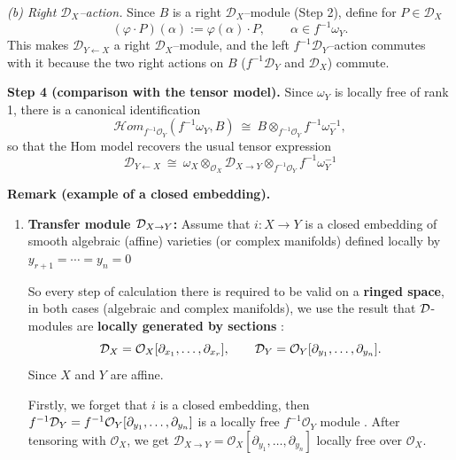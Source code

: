 \begin{example}
    \smallskip
    \emph{(b) Right $\mathcal D_X$--action.}
    Since $B$ is a right $\mathcal D_X$--module (Step 2), define for $P\in\mathcal D_X$
    \[
        (\varphi\cdot P)(\alpha) := \varphi(\alpha)\cdot P,
        \qquad \alpha\in f^{-1}\omega_Y.
    \]
    This makes $\mathcal D_{Y\leftarrow X}$ a right $\mathcal D_X$--module, and the left
    $f^{-1}\mathcal D_Y$--action commutes with it because the two right actions on $B$
    ($f^{-1}\mathcal D_Y$ and $\mathcal D_X$) commute.

    \medskip
    \noindent\textbf{Step 4 (comparison with the tensor model).}
    Since $\omega_Y$ is locally free of rank 1, there is a canonical identification
    \[
        \mathcal Hom_{f^{-1}\mathcal O_Y}(f^{-1}\omega_Y,B)
        \ \cong\ B\otimes_{f^{-1}\mathcal O_Y} f^{-1}\omega_Y^{-1},
    \]
    so that the Hom model recovers the usual tensor expression \cite[Definition~1.3.3]{hotta2008d}
    \[
        \mathcal D_{Y\leftarrow X}
        \ \cong\ \omega_X\otimes_{\mathcal O_X}\mathcal D_{X\to Y}
        \otimes_{f^{-1}\mathcal O_Y} f^{-1}\omega_Y^{-1}
    \]

    \noindent\textbf{Remark (example of a closed embedding).}
    \begin{enumerate}
        \item \textbf{Transfer module $\mathcal{D}_{X\to Y}$:}
              Assume that $i : X \to Y$ is a closed embedding of smooth algebraic (affine) varieties
              (or complex manifolds) defined locally by $y_{r+1} = \cdots = y_n = 0$

              So every step of calculation there is required to be valid on a \textbf{ringed space}, in both cases (algebraic and complex manifolds), we use the result that
              $\mathcal{D}$-modules are \textbf{locally generated by sections} \cite[\href{https://stacks.math.columbia.edu/tag/01AL}{Tag 01AL}, \href{https://stacks.math.columbia.edu/tag/01AN}{Tag 01AN}, \href{https://stacks.math.columbia.edu/tag/01B2}{Tag 01B2}]{stacks-project} \cite[Section~4.1]{hotta2008d}:
              \[
                  \mathcal{D}_X = \mathcal{O}_X [\partial_{x_1}, \dots, \partial_{x_r}],
                  \qquad
                  \mathcal{D}_Y = \mathcal{O}_Y [\partial_{y_1}, \dots, \partial_{y_n}].
              \]
              Since $X$ and $Y$ are affine.

              Firstly, we forget that $i$ is a closed embedding, then $f^{-1}\mathcal{D}_Y = f^{-1}\mathcal{O}_Y [\partial_{y_{1}}, \dots, \partial_{y_n}]$ is a locally free $f^{-1}\mathcal{O}_Y$ module \cite[\href{https://stacks.math.columbia.edu/tag/01AJ}{Tag 01AJ}]{stacks-project}.
              After tensoring with $\mathcal{O}_X$, we get $\mathcal{D}_{X\to Y} = \mathcal{O}_X [\partial_{y_{1}}, \dots, \partial_{y_n}]$ locally free over $\mathcal{O}_X$.


\end{enumerate}
\end{example}
